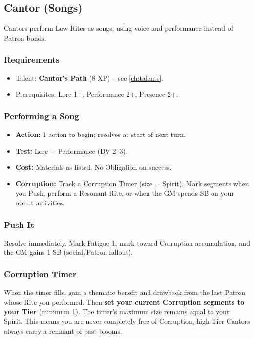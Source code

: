\subsection{Cantor (Songs)}
\label{sec:cantor}

Cantors perform Low Rites as songs, using voice and performance instead of Patron bonds.

\subsubsection*{Requirements}
\begin{itemize}
  \item Talent: \textbf{Cantor's Path} (8 XP) -- see \ref{ch:talents}.
  \item Prerequisites: Lore 1+, Performance 2+, Presence 2+.
\end{itemize}

\subsubsection*{Performing a Song}
\label{sec:performing-song}
\begin{itemize}
  \item \textbf{Action:} 1 action to begin; resolves at start of next turn.
  \item \textbf{Test:} Lore + Performance (DV 2--3).
  \item \textbf{Cost:} Materials as listed. No Obligation on success.
  \item \textbf{Corruption:} Track a Corruption Timer (size = Spirit). Mark segments when you Push, perform a Resonant Rite, or when the GM spends SB on your occult activities.
\end{itemize}

\subsubsection*{Push It}
\label{sec:cantor-push}
Resolve immediately. Mark Fatigue 1, mark toward Corruption accumulation, and the GM gains 1 SB (social/Patron fallout).

\subsubsection*{Corruption Timer}
\label{sec:corruption-timer}
When the timer fills, gain a thematic benefit and drawback from the last Patron whose Rite you performed. Then \textbf{set your current Corruption segments to your Tier} (minimum 1). The timer's maximum size remains equal to your Spirit. This means you are never completely free of Corruption; high-Tier Cantors always carry a remnant of past blooms.

